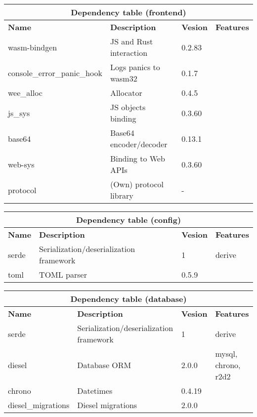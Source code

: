 \documentclass[../documentation.tex]{subfiles}
\begin{document}
\bgroup{}
\def\arraystretch{1.5}
\begin{center}
    \begin{tabular}{ |p{2.3cm}|p{4cm}|p{1.5cm}|p{2cm}| }
        \hline
        \multicolumn{4}{|c|}{\textbf{Dependency table (frontend)}} \\
        \hline
        \textbf{Name} & \textbf{Description} & \textbf{Vesion} & \textbf{Features} \\
        \hline
        wasm-bindgen & JS and Rust interaction & 0.2.83 & \\
        \hline
        console\_error\_panic\_hook & Logs panics to wasm32 & 0.1.7 & \\
        \hline
        wee\_alloc & Allocator & 0.4.5 & \\
        \hline
        js\_sys & JS objects binding & 0.3.60 & \\
        \hline
        base64 & Base64 encoder/decoder & 0.13.1 & \\
        \hline
        web-sys & Binding to Web APIs & 0.3.60 & \\
        \hline
        protocol & (Own) protocol library & - & \\
        \hline
    \end{tabular}
\end{center}
\egroup{}


\bgroup{}
\def\arraystretch{1.5}
\begin{center}
    \begin{tabular}{ |p{2.3cm}|p{4cm}|p{1.5cm}|p{2cm}| }
        \hline
        \multicolumn{4}{|c|}{\textbf{Dependency table (config)}} \\
        \hline
        \textbf{Name} & \textbf{Description} & \textbf{Vesion} & \textbf{Features} \\
        \hline
        serde & Serialization/deserialization framework & 1 & derive \\
        \hline
        toml & TOML parser & 0.5.9 & \\
        \hline
    \end{tabular}
\end{center}
\egroup{}

\bgroup{}
\def\arraystretch{1.5}
\begin{center}
    \begin{tabular}{ |p{2.3cm}|p{4cm}|p{1.5cm}|p{2cm}| }
        \hline
        \multicolumn{4}{|c|}{\textbf{Dependency table (database)}} \\
        \hline
        \textbf{Name} & \textbf{Description} & \textbf{Vesion} & \textbf{Features} \\
        \hline
        serde & Serialization/deserialization framework & 1 & derive \\
        \hline
        diesel & Database ORM & 2.0.0 & mysql, chrono, r2d2 \\
        \hline
        chrono & Datetimes & 0.4.19 & \\
        \hline
        diesel\_migrations & Diesel migrations & 2.0.0 & \\
        \hline
    \end{tabular}
\end{center}
\egroup{}
\end{document}
